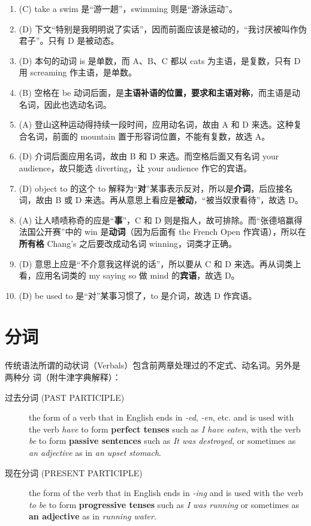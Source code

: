\begin{enumerate}
\item (C) take a swim 是“游一趟”，swimming 则是“游泳运动”。
\item (D) 下文“特别是我明明说了实话”，因而前面应该是被动的，“我讨厌被叫作伪君子”。只有 D 是被动态。
\item (D) 本句的动词 is 是单数，而 A、B、C 都以 cats 为主语，是复数，只有 D 用 screaming 作主语，是单数。
\item (B) 空格在 be 动词后面，是\textbf{主语补语的位置，要求和主语对称}，而主语是动名词，因此也选动名词。
\item (A) 登山这种运动得持续一段时间，应用动名词，故由 A 和 D 来选。这种复合名词，前面的 mountain 置于形容词位置，不能有复数，故选 A。
\item (D) 介词后面应用名词，故由 B 和 D 来选。而空格后面又有名词 your audience，故只能选 diverting，让 your audience 作它的宾语。
\item (D) object to 的这个 to 解释为“\textbf{对}”某事表示反对，所以是\textbf{介词}，后应接名词，故由 B 或 D 来选。再从意思上看应是\textbf{被动}，“被当奴隶看待”，故选 D。
\item (A) 让人啧啧称奇的应是“\textbf{事}”，C 和 D 则是指人，故可排除。而“张德培赢得法国公开赛”中的 win 是\textbf{动词}（因为后面有 the French Open 作宾语），所以在\textbf{所有格} Chang's 之后要改成动名词 winning，词类才正确。
\item (D) 意思上应是“不介意我这样说的话”，所以要从 C 和 D 来选。再从词类上看，应用名词类的 my saying so 做 mind 的\textbf{宾语}，故选 D。
\item (D) be used to 是“对”某事习惯了，to 是介词，故选 D 作宾语。
\end{enumerate}


\chapter{分词}

传统语法所谓的动状词（Verbals）包含前两章处理过的不定式、动名词。另外是两种分
词（附牛津字典解释）：
\begin{description}
\item[过去分词 (PAST PARTICIPLE)]  the form of a verb that in English ends in
  \emph{-ed}, \emph{-en}, etc. and is used with the verb \emph{have} to form
  \textbf{perfect tenses} such as \emph{I have eaten}, with the verb \emph{be}
  to form \textbf{passive sentences} such as \emph{It was destroyed}, or
  sometimes as \emph{an adjective} as in \emph{an upset stomach}.

\item[现在分词 (PRESENT PARTICIPLE)]  the form of the verb that in English ends in \emph{-ing} and
  is used with the verb \emph{to be} to form \textbf{progressive tenses} such
  as \emph{I was running} or sometimes as \textbf{an adjective} as in
  \emph{running water}.
\end{description}

